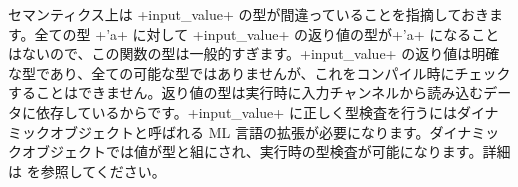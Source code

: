 セマンティクス上は \ml+input_value+ の型が間違っていることを指摘しておきます。全ての型 \ml+'a+ に対して \ml+input_value+ の返り値の型が\ml+'a+ になることはないので、この関数の型は一般的すぎます。\ml+input_value+ の返り値は明確な型であり、全ての可能な型ではありませんが、これをコンパイル時にチェックすることはできません。返り値の型は実行時に入力チャンネルから読み込むデータに依存しているからです。\ml+input_value+ に正しく型検査を行うにはダイナミックオブジェクトと呼ばれる ML 言語の拡張が必要になります。ダイナミックオブジェクトでは値が型と組にされ、実行時の型検査が可能になります。詳細は \cite{Dynamiques} を参照してください。


